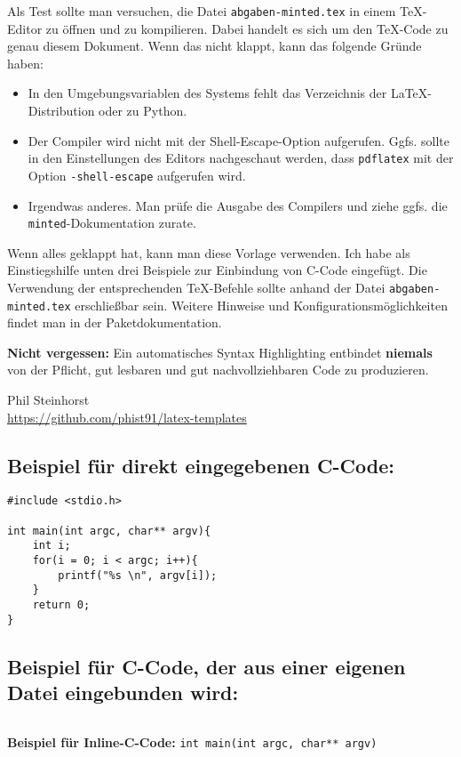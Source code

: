 Als Test sollte man versuchen, die Datei \texttt{abgaben-minted.tex} in einem TeX-Editor zu öffnen und zu kompilieren.
Dabei handelt es sich um den TeX-Code zu genau diesem Dokument.
Wenn das nicht klappt, kann das folgende Gründe haben:
\begin{itemize}
	\item In den Umgebungsvariablen des Systems fehlt das Verzeichnis der \LaTeX-Distribution oder zu Python.
	\item Der Compiler wird nicht mit der Shell-Escape-Option aufgerufen.
		Ggfs. sollte in den Einstellungen des Editors nachgeschaut werden, dass \texttt{pdflatex} mit der Option \texttt{-shell-escape} aufgerufen wird.
	\item Irgendwas anderes. Man prüfe die Ausgabe des Compilers und ziehe ggfs. die \texttt{minted}-Dokumentation zurate.
\end{itemize}
Wenn alles geklappt hat, kann man diese Vorlage verwenden.
Ich habe als Einstiegshilfe unten drei Beispiele zur Einbindung von C-Code eingefügt.
Die Verwendung der entsprechenden TeX-Befehle sollte anhand der Datei \texttt{abgaben-minted.tex} erschließbar sein.
Weitere Hinweise und Konfigurationsmöglichkeiten findet man in der Paketdokumentation.

\textbf{Nicht vergessen:} Ein automatisches Syntax Highlighting entbindet \textbf{niemals} von der Pflicht, gut lesbaren und gut nachvollziehbaren Code zu produzieren.

\begin{flushright}
Phil Steinhorst \\
\url{https://github.com/phist91/latex-templates}
\end{flushright}

\newpage


\subsection*{Beispiel für direkt eingegebenen C-Code:}
\begin{verbatim}
#include <stdio.h>

int main(int argc, char** argv){
	int i;
	for(i = 0; i < argc; i++){
		printf("%s \n", argv[i]);
	}
	return 0;
}
\end{verbatim}

\subsection*{Beispiel für C-Code, der aus einer eigenen Datei eingebunden wird:}

\inputminted{c}{programm.c}



\textbf{Beispiel für Inline-C-Code:} \texttt{int main(int argc, char** argv)}



